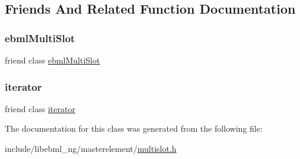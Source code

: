 \subsection{Friends And Related Function Documentation}
\mbox{\label{classebml_1_1const__slot__t_ab14eb6c5a125d7276a7b4b5b6573428b}} 
\subsubsection{\texorpdfstring{ebml\+Multi\+Slot}{ebmlMultiSlot}}
{\footnotesize\ttfamily friend class \mbox{\hyperlink{classebml_1_1ebmlMultiSlot}{ebml\+Multi\+Slot}}\hspace{0.3cm}{\ttfamily [friend]}}

\mbox{\label{classebml_1_1const__slot__t_a67171474c4da6cc8efe0c7fafefd2b2d}} 
\subsubsection{\texorpdfstring{iterator}{iterator}}
{\footnotesize\ttfamily friend class \mbox{\hyperlink{classebml_1_1const__slot__t_1_1iterator}{iterator}}\hspace{0.3cm}{\ttfamily [friend]}}



The documentation for this class was generated from the following file\+:\begin{DoxyCompactItemize}
\item 
include/libebml\+\_\+ng/masterelement/\mbox{\hyperlink{multislot_8h}{multislot.\+h}}\end{DoxyCompactItemize}
